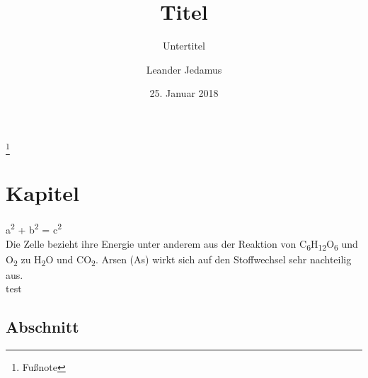 \documentclass[12pt,paper=a4,pagesize=auto,draft=false,
	       headinclude=false,footinclude=false,mpinclude=false,
	      ]{scrbook}
\newcommand*{\hoch}[2]{#1\textsuperscript{#2}}
\newcommand*{\Molek}[2]{\textsf{#1\textsubscript{#2}}}
\begin{document}
  \titlehead{Kopf}
  \subject{Typisierung}
  \title{Titel}
  \subtitle{Untertitel}
  \author{Leander Jedamus}
  \date{25. Januar 2018}
  \publishers{Verlag}
  \thanks{Fußnote}
  \maketitle


  \chapter{Kapitel}
    \hoch a2 + \hoch b2 = \hoch c2\\
    Die Zelle bezieht ihre Energie unter anderem aus der Reaktion von
    \Molek C6\Molek H{12}\Molek O6 und \Molek O2 zu \Molek H2\Molek O{}
    und \Molek C{}\Molek O2. Arsen (\Molek {As}{}) wirkt sich auf den
    Stoffwechsel sehr nachteilig aus.\\
    test\\
  \flushbottom%
  \lipsum[1-20]
  \section{Abschnitt}
  \raggedbottom%
  \lipsum[21-40]
\end{document}
